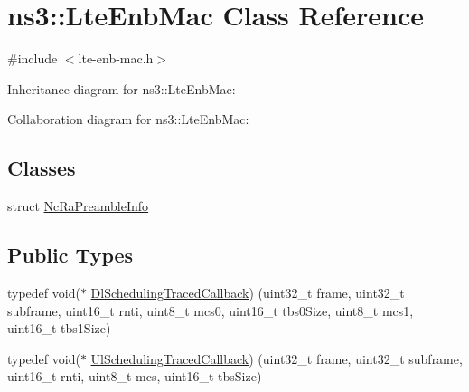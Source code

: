 \hypertarget{classns3_1_1LteEnbMac}{}\section{ns3\+:\+:Lte\+Enb\+Mac Class Reference}
\label{classns3_1_1LteEnbMac}


{\ttfamily \#include $<$lte-\/enb-\/mac.\+h$>$}



Inheritance diagram for ns3\+:\+:Lte\+Enb\+Mac\+:


Collaboration diagram for ns3\+:\+:Lte\+Enb\+Mac\+:
\subsection*{Classes}
\begin{DoxyCompactItemize}
\item 
struct \hyperlink{structns3_1_1LteEnbMac_1_1NcRaPreambleInfo}{Nc\+Ra\+Preamble\+Info}
\end{DoxyCompactItemize}
\subsection*{Public Types}
\begin{DoxyCompactItemize}
\item 
typedef void($\ast$ \hyperlink{classns3_1_1LteEnbMac_a8f58bda898cc5a176a9275e96a3469fe}{Dl\+Scheduling\+Traced\+Callback}) (uint32\+\_\+t frame, uint32\+\_\+t subframe, uint16\+\_\+t rnti, uint8\+\_\+t mcs0, uint16\+\_\+t tbs0\+Size, uint8\+\_\+t mcs1, uint16\+\_\+t tbs1\+Size)
\item 
typedef void($\ast$ \hyperlink{classns3_1_1LteEnbMac_a4b2d38003a1204ab868e76f7faedaf33}{Ul\+Scheduling\+Traced\+Callback}) (uint32\+\_\+t frame, uint32\+\_\+t subframe, uint16\+\_\+t rnti, uint8\+\_\+t mcs, uint16\+\_\+t tbs\+Size)
\end{DoxyCompactItemize}
